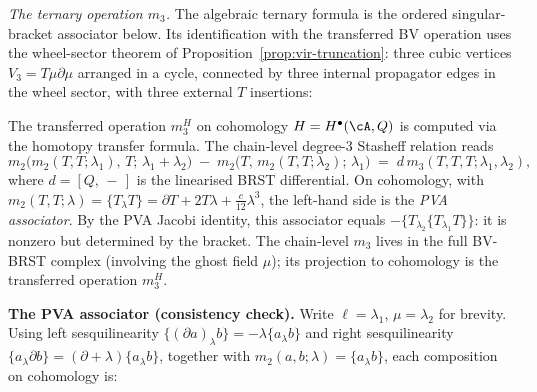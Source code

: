 \medskip
\noindent\emph{The ternary operation $m_3$.}
The algebraic ternary formula is the ordered singular-bracket
associator below. Its identification with the transferred BV operation
uses the wheel-sector theorem of
Proposition~\ref{prop:vir-truncation}: three cubic vertices
$V_3 = T\mu\partial\mu$ arranged in a cycle, connected by three
internal propagator edges in the wheel sector, with three
external $T$ insertions:
\begin{center}
\end{center}

The transferred operation $m_3^H$ on cohomology $H = H^\bullet(\cA,Q)$ is computed via the homotopy transfer formula. The chain-level degree-$3$ Stasheff relation reads
\begin{equation}
\label{eq:vir-stasheff-3}
m_2\bigl(m_2(T,T;\lambda_1),\, T;\, \lambda_1+\lambda_2\bigr)
\;-\; m_2\bigl(T,\, m_2(T,T;\lambda_2);\, \lambda_1\bigr)
\;=\; d\, m_3(T,T,T;\lambda_1,\lambda_2),
\end{equation}
where $d = [Q,\,-\,]$ is the linearised BRST differential.
On cohomology, with $m_2(T,T;\lambda) = \{T_\lambda T\} = \partial T + 2T\lambda + \tfrac{c}{12}\lambda^3$, the left-hand side is the \emph{PVA associator}. By the PVA Jacobi identity, this associator equals $-\{T_{\lambda_2}\{T_{\lambda_1} T\}\}$: it is nonzero but determined by the bracket. The chain-level $m_3$ lives in the full BV-BRST complex (involving the ghost field $\mu$); its projection to cohomology is the transferred operation $m_3^H$.

\medskip
\noindent\textbf{The PVA associator (consistency check).}
Write $\ell = \lambda_1$, $\mu = \lambda_2$ for brevity.
Using left sesquilinearity $\{(\partial a)_\lambda b\} = -\lambda\{a_\lambda b\}$ and
right sesquilinearity $\{a_\lambda \partial b\} = (\partial + \lambda)\{a_\lambda b\}$,
together with $m_2(a,b;\lambda) = \{a_\lambda b\}$, each composition on cohomology is:


